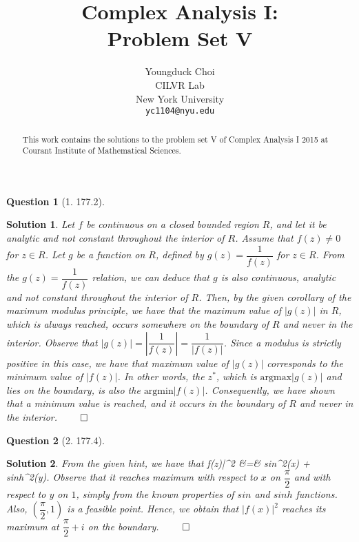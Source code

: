 \documentclass{article} %
\title{Complex Analysis I: \\
Problem Set V}
\author{
Youngduck Choi \\
CILVR Lab \\
New York University\\
\texttt{yc1104@nyu.edu} \\
}
\def\eQb#1\eQe{\begin{eqnarray*}#1\end{eqnarray*}}
\theoremstyle{quest}
\newtheorem*{question}{Question}
\newtheorem*{solution}{Solution}
\begin{document}
\maketitle

\begin{abstract}
This work contains the solutions to the problem set V
of Complex Analysis I 2015 at Courant Institute of Mathematical Sciences.
\end{abstract}

\bigskip

\begin{question}[1. 177.2]
\end{question}
\begin{solution}
Let $f$ be continuous on a closed bounded region $R$, and let it be
analytic and not constant throughout the interior of $R$. Assume 
that $f(z) \neq 0$ for $z \in R$. Let $g$ be a function on $R$,
defined by $g(z) = \dfrac{1}{f(z)}$ for $z \in R$. From the $g(z) = 
\dfrac{1}{f(z)}$ relation, we can deduce that
$g$ is also continuous, analytic and not constant throughout the interior
of $R$. Then, by the given corollary of the maximum modulus principle,
we have that the maximum value of $|g(z)|$ in $R$, which is always 
reached, occurs somewhere on the boundary of $R$ and never in the interior.
Observe that $|g(z)| = |\dfrac{1}{f(z)}| = \dfrac{1}{|f(z)|}$. Since
a modulus is strictly positive in this case, we have that maximum value
of $|g(z)|$ corresponds to the minimum value of $|f(z)|$. 
In other words,
the $z^*$, which is $\text{argmax} |g(z)|$ and lies on the boundary, is also
the $\text{argmin} |f(z)|$. Consequently, we have shown that a minimum
value is reached, and it occurs in the boundary of $R$ and never in
the interior. $\qed$ 
\end{solution}

\bigskip

\begin{question}[2. 177.4]
\end{question}
\begin{solution}
From the given hint, we have that
\eQb
|f(z)|^2 &=& sin^2(x) + sinh^2(y). 
\eQe
Observe that it reaches maximum with respect to $x$ on $\dfrac{\pi}{2}$
and with respect to $y$ on $1$, simply from the known properties of $sin$
and $sinh$ functions. Also, $(\dfrac{\pi}{2},1)$ is a feasible point.
Hence, we obtain that $|f(x)|^2$ reaches its maximum at $\dfrac{\pi}{2}
+ i$ on the boundary. $\qed$ 
\end{solution}

\bigskip
\end{document}
